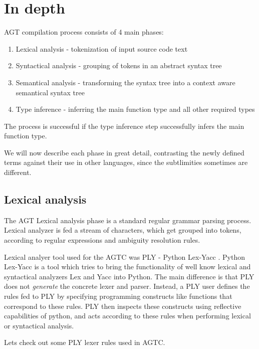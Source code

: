 \documentclass[times, utf8, diplomski]{fer}
\begin{document}
\section{In depth}

AGT compilation process consists of 4 main phases: 

\begin{enumerate}
\item Lexical analysis - tokenization of input source code text
\item Syntactical analysis - grouping of tokens in an abstract syntax tree
\item Semantical analysis - transforming the syntax tree into a context aware semantical syntax tree
\item Type inference - inferring the main function type and all other required types
\end{enumerate}

The process is successful if the type inference step successfully infers the main function type.

We will now describe each phase in great detail, contrasting the newly defined terms
against their use in other languages, since the subtlimities sometimes are different.

\subsection{Lexical analysis}

The AGT Lexical analysis phase is a standard regular grammar parsing process.
Lexical analyzer is fed a stream of characters, which get grouped into tokens,
according to regular expressions and ambiguity resolution rules.

Lexical analyer tool used for the AGTC was PLY - Python Lex-Yacc \citep{c_ply_beazley}.
Python Lex-Yacc is a tool which tries to bring the functionality of well know lexical and syntactical
analyzers Lex and Yacc into Python. The main difference is that PLY does not \textit{generate} the 
concrete lexer and parser. Instead, a PLY user defines the rules fed to PLY by specifying programming 
constructs like functions that correspond to these rules. PLY then inspects these constructs using 
reflective capabilities of python, and acts according to these rules
when performing lexical or syntactical analysis.

Lets check out some PLY lexer rules used in AGTC.


\end{document}
